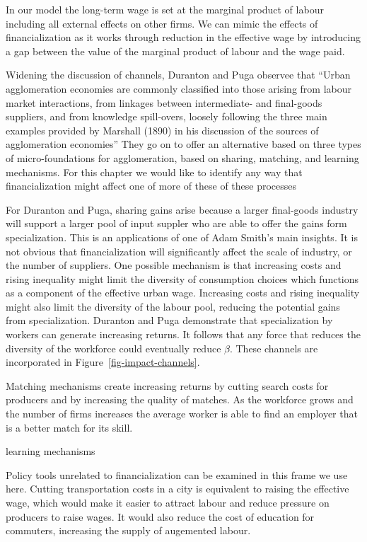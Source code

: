  In our model the long-term wage is set at the marginal product of labour including all external effects on other firms. 
 We can mimic the effects of financialization as it works through reduction in the effective wage by introducing a gap between the value of the marginal product of labour and the wage paid. 


Widening the discussion of channels, Duranton and Puga \cite{durantonMicroFoundationsUrbanAgglomeration2004} observee that ``Urban agglomeration economies are commonly classified into those arising from labour market interactions, from linkages between intermediate- and final-goods suppliers, and from knowledge spill-overs, loosely following the three main examples provided by Marshall (1890) in his discussion of the sources of agglomeration economies''  They go on to offer an alternative based on three types of micro-foundations for agglomeration, based on sharing, matching, and learning mechanisms. For this chapter we would like to identify any way that  financialization might affect one of more of these  of these processes 

For Duranton and Puga, sharing gains arise because a larger final-goods industry will support a larger pool of input suppler who are able to offer the gains form specialization. This is an applications of one of Adam Smith's main insights. It is not obvious that financialization will significantly affect the scale of industry, or the number of suppliers.   One possible mechanism is that increasing costs and rising inequality might limit the diversity of consumption choices which functions as a component of the effective urban wage. Increasing costs and rising inequality might also limit the diversity of the labour pool, reducing the potential gains from specialization. Duranton and Puga  demonstrate that specialization by workers can generate increasing returns. It follows that any force that reduces the diversity of the workforce could eventually reduce $\beta$.  These channels are incorporated in Figure~\ref{fig-impact-channels}.

Matching mechanisms create increasing returns by cutting search costs for producers and by increasing the quality of matches. As the workforce grows and the number of firms increases the average worker is able to find an employer that is a better match for its skill. 

learning mechanisms

Policy tools unrelated to financialization can be examined in this  frame we use here. Cutting transportation costs in a city is equivalent to raising the effective wage, which would  make it easier to attract labour and reduce pressure on producers to raise wages. It would also reduce the cost of education for commuters, increasing the supply of augemented labour.


